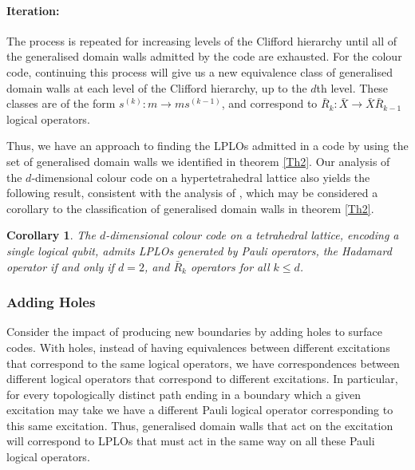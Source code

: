 \documentclass[pra,twocolumn,a4paper,nofootinbib]{revtex4-1}
\newtheorem{cor}{Corollary}
\begin{document}
\paragraph*{Iteration:} The process is repeated for increasing levels of the Clifford hierarchy until all of the generalised domain walls admitted by the code are exhausted. For the colour code, continuing this process will give us a new equivalence class of generalised domain walls at each level of the Clifford hierarchy, up to the $d$th level. These classes are of the form $s^{(k)}: m \to ms^{(k-1)}$, and correspond to $\bar{R}_k: \bar{X} \to \bar{X}\bar{R}_{k-1}$ logical operators.

Thus, we have an approach to finding the LPLOs admitted in a code by using the set of generalised domain walls we identified in theorem \ref{Th2}. Our analysis of the $d$-dimensional colour code on a hypertetrahedral lattice also yields the following result, consistent with the analysis of \cite{Kubica}, which may be considered a corollary to the classification of generalised domain walls in theorem \ref{Th2}.

\begin{cor}
The $d$-dimensional colour code on a tetrahedral lattice, encoding a single logical qubit, admits LPLOs generated by Pauli operators, the Hadamard operator if and only if $d=2$, and $\bar{R}_k$ operators for all $k \leq d$.
\end{cor}

\subsubsection{Adding Holes}
Consider the impact of producing new boundaries by adding holes to surface codes. With holes, instead of having equivalences between different excitations that correspond to the same logical operators, we have correspondences between different logical operators that correspond to different excitations. In particular, for every topologically distinct path ending in a boundary which a given excitation may take we have a different Pauli logical operator corresponding to this same excitation. Thus, generalised domain walls that act on the excitation will correspond to LPLOs that must act in the same way on all these Pauli logical operators.
\end{document}
